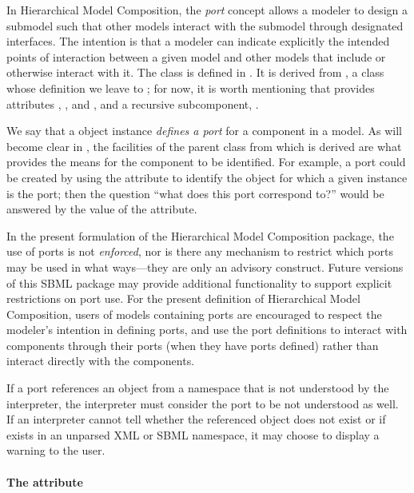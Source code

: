 In Hierarchical Model Composition, the \emph{port} concept allows a modeler to design a submodel such that other models interact with the submodel through designated interfaces.  The intention is that a modeler can indicate explicitly the intended points of interaction between a given model and other models that include or otherwise interact with it. The \Port class is defined in .  It is derived from \SBaseRef, a class whose definition we leave to ; for now, it is worth mentioning that \SBaseRef provides attributes , ,  and , and a recursive subcomponent, .

We say that a \Port object instance \emph{defines a port} for a component in a model.  As will become clear in , the facilities of the \SBaseRef parent class from which \Port is derived are what provides the means for the component to be identified.  For example, a port could be created by using the  attribute to identify the object for which a given \Port instance is the port; then the question ``what does this port correspond to?'' would be answered by the value of the  attribute.

In the present formulation of the Hierarchical Model Composition package, the use of ports is not \emph{enforced}, nor is there any mechanism to restrict which ports may be used in what ways---they are only an advisory construct.  Future versions of this SBML package may provide additional functionality to support explicit restrictions on port use.  For the present definition of Hierarchical Model Composition, users of models containing ports are encouraged to respect the modeler's intention in defining ports, and use the port definitions to interact with components through their ports (when they have ports defined) rather than interact directly with the components.

If a port references an object from a namespace that is not understood by the interpreter, the interpreter must consider the port to be not understood as well.  If an interpreter cannot tell whether the referenced object does not exist or if exists in an unparsed XML or SBML namespace, it may choose to display a warning to the user.

\paragraph{The \fixttspace{} attribute}

